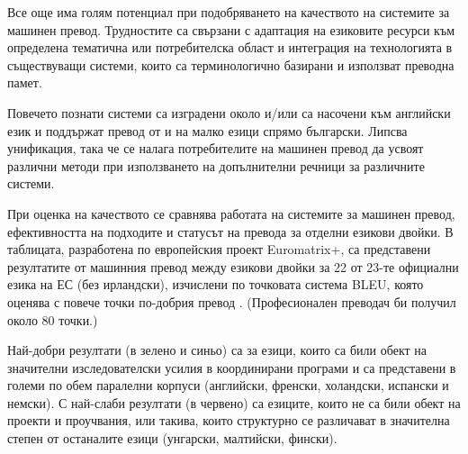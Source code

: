 \documentclass[]{../../metanetpaper}
\begin{document}
\begin{multicols}{2}
Все  още има голям потенциал при подобряването на качеството на системите за машинен превод. Трудностите са свързани с адаптация на езиковите ресурси към определена тематична или потребителска област и интеграция на технологията в
 съществуващи системи, които са терминологично базирани и използват преводна памет. 

Повечето познати системи са изградени около и/или са насочени към английски език и поддържат превод от и на малко езици спрямо български. Липсва унификация, така че се налага потребителите на машинен превод да усвоят
 различни методи при използването на допълнителни речници за различните системи.

При оценка на качеството се сравнява работата на системите за
 машинен превод, ефективността на подходите и статусът на превода за отделни
 езикови двойки. В таблицата, разработена по европейския проект
 Euromatrix+, са представени резултатите от машинния
 превод между езикови двойки за 22 от 23-те официални езика на ЕС
 (без ирландски), изчислени по точковата система BLEU, която оценява с повече точки по-добрия превод \cite{bleu1}. (Професионален преводач би получил около 80 точки.)

Най-добри резултати (в зелено и синьо) са за езици, които са били обект на значителни изследователски усилия в координирани програми и са представени в големи по обем паралелни корпуси (английски, френски, холандски, испански и немски). С най-слаби резултати (в червено) са езиците, които не са били обект на проекти и проучвания, или такива, които структурно се различават в значителна степен от останалите езици (унгарски, малтийски, фински).



\end{multicols}
\end{document}
